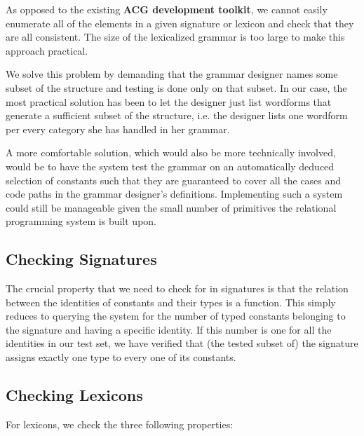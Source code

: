 As opposed to the existing \textbf{ACG development toolkit}, we cannot
easily enumerate all of the elements in a given signature or lexicon and
check that they are all consistent. The size of the lexicalized grammar
is too large to make this approach practical.

We solve this problem by demanding that the grammar designer names some
subset of the structure and testing is done only on that subset. In our
case, the most practical solution has been to let the designer just list
wordforms that generate a sufficient subset of the structure, i.e. the
designer lists one wordform per every category she has handled in her
grammar.

A more comfortable solution, which would also be more technically
involved, would be to have the system test the grammar on an
automatically deduced selection of constants such that they are
guaranteed to cover all the cases and code paths in the grammar
designer's definitions. Implementing such a system could still be
manageable given the small number of primitives the relational
programming system is built upon.

\subsection{Checking Signatures}
\label{ssec:check-sig}

The crucial property that we need to check for in signatures is that the
relation between the identities of constants and their types is a
function. This simply reduces to querying the system for the number of
typed constants belonging to the signature and having a specific
identity. If this number is one for all the identities in our test set,
we have verified that (the tested subset of) the signature assigns
exactly one type to every one of its constants.

\subsection{Checking Lexicons}

For lexicons, we check the three following properties:

